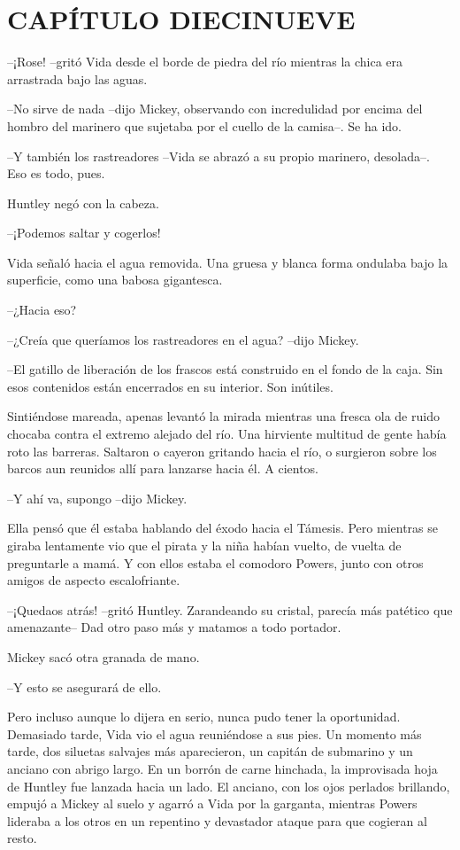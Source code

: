 \chapter*{CAPÍTULO DIECINUEVE}

{--¡Rose! --gritó Vida desde el borde de piedra del río mientras la
chica era arrastrada bajo las aguas.}

{--No sirve de nada --dijo Mickey, observando con incredulidad por
 encima del hombro del marinero que sujetaba por el cuello de la
camisa--. Se ha ido.}

{--Y también los rastreadores --Vida se abrazó a su propio marinero,
desolada--. Eso es todo, pues.}

{Huntley negó con la cabeza.}

{--¡Podemos saltar y cogerlos!}

{Vida señaló hacia el agua removida. Una gruesa y blanca forma ondulaba
bajo la superficie, como una babosa gigantesca.}

{--¿Hacia eso?}

{--¿Creía que queríamos los rastreadores en el agua? --dijo Mickey.}

{--El gatillo de liberación de los frascos está construido en el fondo
 de la caja. Sin esos contenidos están encerrados en su interior. Son
inútiles.}

{Sintiéndose mareada, apenas levantó la mirada mientras una fresca ola
 de ruido chocaba contra el extremo alejado del río. Una hirviente
 multitud de gente había roto las barreras. Saltaron o cayeron gritando
 hacia el río, o surgieron sobre los barcos aun reunidos allí para
lanzarse hacia él. A cientos.}

{--Y ahí va, supongo --dijo Mickey.}

{Ella pensó que él estaba hablando del éxodo hacia el Támesis. Pero
 mientras se giraba lentamente vio que el pirata y la niña habían vuelto,
 de vuelta de preguntarle a mamá. Y con ellos estaba el comodoro Powers,
junto con otros amigos de aspecto escalofriante.}

{--¡Quedaos atrás! --gritó Huntley. Zarandeando su cristal, parecía más
patético que amenazante-- Dad otro paso más y matamos a todo portador.}

{Mickey sacó otra granada de mano.}

{--Y esto se asegurará de ello.}

{Pero incluso aunque lo dijera en serio, nunca pudo tener la
 oportunidad. Demasiado tarde, Vida vio el agua reuniéndose a sus pies.
 Un momento más tarde, dos siluetas salvajes más aparecieron, un capitán
 de submarino y un anciano con abrigo largo. En un borrón de carne
 hinchada, la improvisada hoja de Huntley fue lanzada hacia un lado. El
 anciano, con los ojos perlados brillando, empujó a Mickey al suelo y
 agarró a Vida por la garganta, mientras Powers lideraba a los otros en
un repentino y devastador ataque para que cogieran al resto.}

